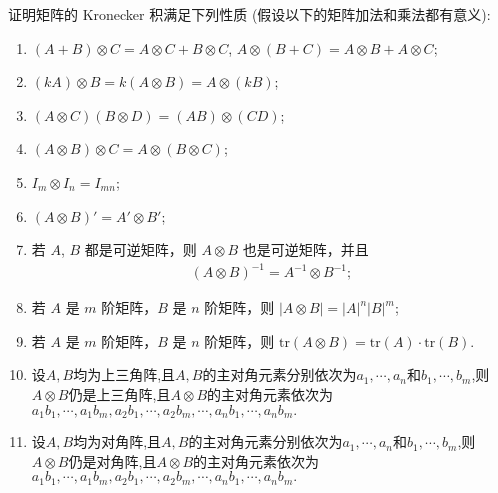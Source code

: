 \documentclass[../../main.tex]{subfiles}
\begin{document}
\begin{theorem}[矩阵的Kronecker积的基本性质]\label{theorem:矩阵的Kronecker积的基本性质}
证明矩阵的 Kronecker 积满足下列性质 (假设以下的矩阵加法和乘法都有意义):
\begin{enumerate}[(1)]
\item\label{矩阵的Kronecker积的基本性质(1)} $(A + B)\otimes C = A\otimes C + B\otimes C$, $A\otimes (B + C) = A\otimes B + A\otimes C$;
\item\label{矩阵的Kronecker积的基本性质(2)} $(kA)\otimes B = k(A\otimes B) = A\otimes (kB)$;
\item\label{矩阵的Kronecker积的基本性质(3)} $(A\otimes C)(B\otimes D)=(AB)\otimes (CD)$;
\item\label{矩阵的Kronecker积的基本性质(4)} $(A\otimes B)\otimes C = A\otimes (B\otimes C)$;
\item\label{矩阵的Kronecker积的基本性质(5)} $I_m\otimes I_n = I_{mn}$;
\item\label{矩阵的Kronecker积的基本性质(6)} $(A\otimes B)' = A'\otimes B'$;
\item\label{矩阵的Kronecker积的基本性质(7)} 若 $A$, $B$ 都是可逆矩阵，则 $A\otimes B$ 也是可逆矩阵，并且
\begin{align*}
(A\otimes B)^{-1}=A^{-1}\otimes B^{-1};
\end{align*}
\item\label{矩阵的Kronecker积的基本性质(8)} 若 $A$ 是 $m$ 阶矩阵，$B$ 是 $n$ 阶矩阵，则 $|A\otimes B| = |A|^n|B|^m$;
\item\label{矩阵的Kronecker积的基本性质(9)} 若 $A$ 是 $m$ 阶矩阵，$B$ 是 $n$ 阶矩阵，则 $\mathrm{tr}(A\otimes B)=\mathrm{tr}(A)\cdot\mathrm{tr}(B)$.
\item\label{矩阵的Kronecker积的基本性质(10)} 设$A,B$均为上三角阵,且$A,B$的主对角元素分别依次为$a_1,\cdots,a_n$和$b_1,\cdots,b_m$,则$A\otimes B$仍是上三角阵,且$A\otimes B$的主对角元素依次为$a_1b_1,\cdots,a_1b_m,a_2b_1,\cdots,a_2b_m,\cdots,a_nb_1,\cdots,a_nb_m.$
\item\label{矩阵的Kronecker积的基本性质(11)} 设$A,B$均为对角阵,且$A,B$的主对角元素分别依次为$a_1,\cdots,a_n$和$b_1,\cdots,b_m$,则$A\otimes B$仍是对角阵,且$A\otimes B$的主对角元素依次为$a_1b_1,\cdots,a_1b_m,a_2b_1,\cdots,a_2b_m,\cdots,a_nb_1,\cdots,a_nb_m.$
\end{enumerate}
\end{theorem}
\end{document}
